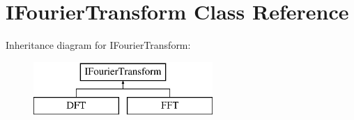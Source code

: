 \hypertarget{class_i_fourier_transform}{}\section{I\+Fourier\+Transform Class Reference}
\label{class_i_fourier_transform}
Inheritance diagram for I\+Fourier\+Transform\+:\begin{figure}[H]
\begin{center}
\leavevmode
\includegraphics[height=2.000000cm]{class_i_fourier_transform}
\end{center}
\end{figure}
